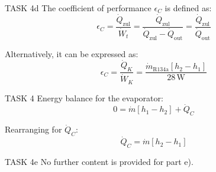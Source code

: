 TASK 4d  
The coefficient of performance \( \epsilon_C \) is defined as:  
\[
\epsilon_C = \frac{\dot{Q}_{\text{zul}}}{\dot{W}_t} = \frac{\dot{Q}_{\text{zul}}}{\dot{Q}_{\text{zul}} - \dot{Q}_{\text{out}}} = \frac{\dot{Q}_{\text{zul}}}{\dot{Q}_{\text{out}}}
\]

Alternatively, it can be expressed as:  
\[
\epsilon_C = \frac{\dot{Q}_K}{\dot{W}_K} = \frac{\dot{m}_{\text{R134a}} \left[ h_2 - h_1 \right]}{28 \, \text{W}}
\]

TASK 4  
Energy balance for the evaporator:  
\[
0 = \dot{m} \left[ h_1 - h_2 \right] + \dot{Q}_C
\]

Rearranging for \( \dot{Q}_C \):  
\[
\dot{Q}_C = \dot{m} \left[ h_2 - h_1 \right]
\]

TASK 4e  
No further content is provided for part e).
